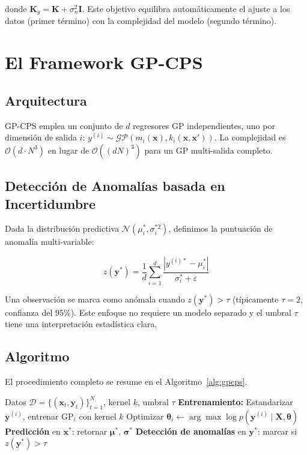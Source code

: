 \documentclass[conference]{IEEEtran}
\begin{document}
donde $\mathbf{K}_y = \mathbf{K} + \sigma_n^2 \mathbf{I}$. Este objetivo equilibra automáticamente el ajuste a los datos (primer término) con la complejidad del modelo (segundo término).

\section{El Framework GP-CPS}
\label{sec:metodo}

\subsection{Arquitectura}
GP-CPS emplea un conjunto de $d$ regresores GP independientes, uno por dimensión de salida $i$: $y^{(i)} \sim \mathcal{GP}(m_i(\mathbf{x}), k_i(\mathbf{x}, \mathbf{x}'))$. La complejidad es $\mathcal{O}(d \cdot N^3)$ en lugar de $\mathcal{O}((dN)^3)$ para un GP multi-salida completo.

\subsection{Detección de Anomalías basada en Incertidumbre}
Dada la distribución predictiva $\mathcal{N}(\mu_i^*, \sigma_i^{*2})$, definimos la puntuación de anomalía multi-variable:

\begin{equation}
z(\mathbf{y}^*) = \frac{1}{d} \sum_{i=1}^d \frac{|y^{(i)*} - \mu_i^*|}{\sigma_i^* + \varepsilon}
\label{eq:score_anomalia}
\end{equation}

Una observación se marca como anómala cuando $z(\mathbf{y}^*) > \tau$ (típicamente $\tau = 2$, confianza del 95\%). Este enfoque no requiere un modelo separado y el umbral $\tau$ tiene una interpretación estadística clara.

\subsection{Algoritmo}
El procedimiento completo se resume en el Algoritmo~\ref{alg:gpcps}.

\begin{algorithm}[t]
\caption{GP-CPS: Entrenamiento e Inferencia}
\label{alg:gpcps}
\begin{algorithmic}
\REQUIRE Datos $\mathcal{D} = \{(\mathbf{x}_t, \mathbf{y}_t)\}_{t=1}^N$, kernel $k$, umbral $\tau$
\STATE \textbf{Entrenamiento:}
\STATE Estandarizar $\mathbf{y}^{(i)}$, entrenar GP$_i$ con kernel $k$
\STATE Optimizar $\boldsymbol{\theta}_i \leftarrow \arg\max \log p(\mathbf{y}^{(i)} \mid \mathbf{X}, \boldsymbol{\theta})$
\ENDFOR
\STATE \textbf{Predicción} en $\mathbf{x}^*$: retornar $\boldsymbol{\mu}^*$, $\boldsymbol{\sigma}^*$
\STATE \textbf{Detección de anomalías} en $\mathbf{y}^*$: marcar si $z(\mathbf{y}^*) > \tau$
\end{algorithmic}
\end{algorithm}
\end{document}
